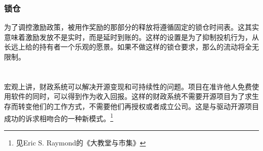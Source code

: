 \subsubsection{锁仓} 为了调控激励政策，被用作奖励的那部分\oscoin{}的释放将遵循固定的锁仓时间表。这其实意味着激励发放不是实时，而是延时到账的。这样的设置是为了抑制投机行为，从长远上给\oscoin{}的持有者一个乐观的愿景。如果不做这样的锁仓要求，那么\oscoin{}的流动将全无限制。
\label{s:vesting}

\section*{}

\noindent 宏观上讲，\oscoin{}财政系统可以解决开源变现和可持续性的问题。项目在准许他人免费使用软件的同时，可以得到\oscoin{}作为收入回报。这样的财政系统不需要开源项目为了求生存而转变他们的工作方式，不需要他们再授权或者成立公司。这是与驱动开源项目成功的诉求相吻合的一种新模式。\footnote{见Eric S. Raymond的《大教堂与市集》}
